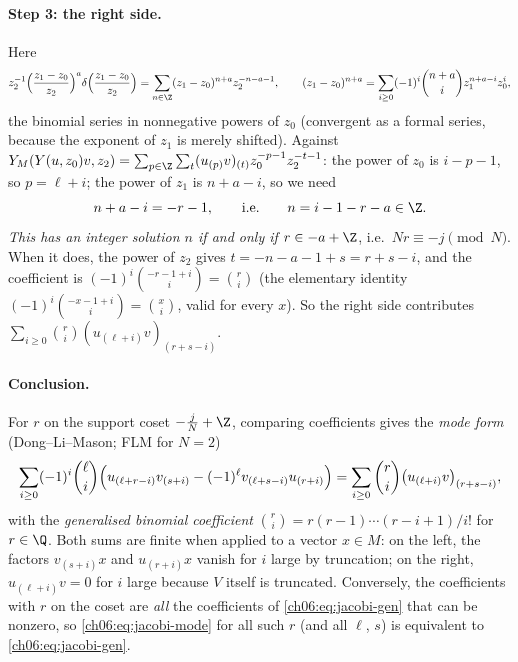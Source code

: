 \paragraph{Step 3: the right side.}  Here
\begin{equation*}
  z_2^{-1}\Bigl(\frac{z_1-z_0}{z_2}\Bigr)^{a}\delta\Bigl(\frac{z_1-z_0}{z_2}\Bigr)
  =\sum_{n\in\Z}(z_1-z_0)^{n+a}z_2^{-n-a-1},\qquad
  (z_1-z_0)^{n+a}=\sum_{i\ge0}(-1)^i\binom{n+a}{i}z_1^{n+a-i}z_0^{i},
\end{equation*}
the binomial series in nonnegative powers of $z_0$ (convergent as a formal series, because the
exponent of $z_1$ is merely shifted).  Against $Y_M(Y(u,z_0)v,z_2)=\sum_{p\in\Z}\sum_t
(u_{(p)}v)_{(t)}z_0^{-p-1}z_2^{-t-1}$: the power of $z_0$ is $i-p-1$, so $p=\ell+i$; the power of
$z_1$ is $n+a-i$, so we need
\begin{equation}\label{ch06:eq:cosetcond}
  n+a-i=-r-1,\qquad\text{i.e.}\qquad n=i-1-r-a\in\Z .
\end{equation}
\emph{This has an integer solution $n$ if and only if $r\in-a+\Z$}, i.e.\ $Nr\equiv -j\pmod N$.
When it does, the power of $z_2$ gives $t=-n-a-1+s=r+s-i$, and the coefficient is
$(-1)^i\binom{-r-1+i}{i}=\binom ri$ (the elementary identity
$(-1)^i\binom{-x-1+i}{i}=\binom xi$, valid for every $x$).  So the right side contributes
$\sum_{i\ge0}\binom ri(u_{(\ell+i)}v)_{(r+s-i)}$.

\paragraph{Conclusion.}  For $r$ on the support coset $-\frac jN+\Z$, comparing coefficients gives
the \emph{mode form} (Dong--Li--Mason; FLM for $N=2$)
\begin{equation}\label{ch06:eq:jacobi-mode}
  \sum_{i\ge0}(-1)^i\binom{\ell}{i}\Bigl(u_{(\ell+r-i)}v_{(s+i)}
     -(-1)^{\ell}v_{(\ell+s-i)}u_{(r+i)}\Bigr)
  =\sum_{i\ge0}\binom{r}{i}\bigl(u_{(\ell+i)}v\bigr)_{(r+s-i)},
\end{equation}
with the \emph{generalised binomial coefficient} $\binom{r}{i}=r(r-1)\cdots(r-i+1)/i!$ for
$r\in\Q$.  Both sums are finite when applied to a vector $x\in M$: on the left, the factors
$v_{(s+i)}x$ and $u_{(r+i)}x$ vanish for $i$ large by truncation; on the right, $u_{(\ell+i)}v=0$
for $i$ large because $V$ itself is truncated.  Conversely, the coefficients with $r$ on the coset
are \emph{all} the coefficients of \eqref{ch06:eq:jacobi-gen} that can be nonzero, so
\eqref{ch06:eq:jacobi-mode} for all such $r$ (and all $\ell$, $s$) is equivalent to
\eqref{ch06:eq:jacobi-gen}.

